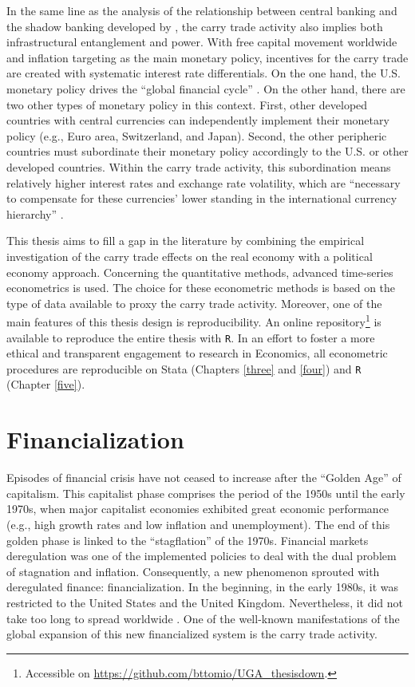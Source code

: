 \documentclass[a4paper, twoside]{templates/ociamthesis}
\begin{document}
In the same line as the analysis of the relationship between central banking and the shadow banking developed by \textcite{braun2020}, the carry trade activity also implies both infrastructural entanglement and power. With free capital movement worldwide and inflation targeting as the main monetary policy, incentives for the carry trade are created with systematic interest rate differentials. On the one hand, the U.S. monetary policy drives the ``global financial cycle'' \autocite{miranda-agrippino2020}. On the other hand, there are two other types of monetary policy in this context. First, other developed countries with central currencies can independently implement their monetary policy (e.g., Euro area, Switzerland, and Japan). Second, the other peripheric countries must subordinate their monetary policy accordingly to the U.S. or other developed countries. Within the carry trade activity, this subordination means relatively higher interest rates and exchange rate volatility, which are ``necessary to compensate for these currencies' lower standing in the international currency hierarchy'' \autocite[ 183]{bonizzi2020}.

This thesis aims to fill a gap in the literature by combining the empirical investigation of the carry trade effects on the real economy with a political economy approach. Concerning the quantitative methods, advanced time-series econometrics is used. The choice for these econometric methods is based on the type of data available to proxy the carry trade activity. Moreover, one of the main features of this thesis design is reproducibility. An online repository\footnote{Accessible on \url{https://github.com/bttomio/UGA_thesisdown}.} is available to reproduce the entire thesis with \texttt{R}. In an effort to foster a more ethical and transparent engagement to research in Economics, all econometric procedures are reproducible on Stata (Chapters \ref{three} and \ref{four}) and \texttt{R} (Chapter \ref{five}).

\hypertarget{twotwo}{%
\section{Financialization}\label{twotwo}}

\noindent Episodes of financial crisis have not ceased to increase after the ``Golden Age'' of capitalism. This capitalist phase comprises the period of the 1950s until the early 1970s, when major capitalist economies exhibited great economic performance (e.g., high growth rates and low inflation and unemployment). The end of this golden phase is linked to the ``stagflation'' of the 1970s. Financial markets deregulation was one of the implemented policies to deal with the dual problem of stagnation and inflation. Consequently, a new phenomenon sprouted with deregulated finance: financialization. In the beginning, in the early 1980s, it was restricted to the United States and the United Kingdom. Nevertheless, it did not take too long to spread worldwide \autocite{hein2015b}. One of the well-known manifestations of the global expansion of this new financialized system is the carry trade activity.
\end{document}

